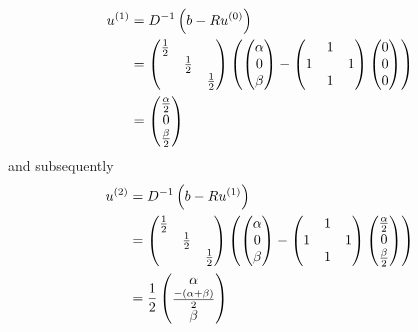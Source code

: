   \begin{align}
    u^{(1)} &= D^{-1}\left(b-Ru^{(0)}\right)\\\nonumber
    &= \begin{pmatrix}
      \frac{1}{2}&&\\
      &\frac{1}{2}&\\
      &&\frac{1}{2}
    \end{pmatrix}\left(  \begin{pmatrix}
      \alpha\\0\\\beta
    \end{pmatrix}-\begin{pmatrix}
      &1&\\
      1&&1\\
      &1&
    \end{pmatrix}\begin{pmatrix}
    0\\0\\0
  \end{pmatrix}\right)\\\nonumber
  &= \begin{pmatrix}
  \frac{\alpha}{2}\\0\\\frac{\beta}{2}
  \end{pmatrix}
  \end{align}
and subsequently
\begin{align}
  u^{(2)} &= D^{-1}\left(b-Ru^{(1)}\right)\\\nonumber
  &= \begin{pmatrix}
    \frac{1}{2}&&\\
    &\frac{1}{2}&\\
    &&\frac{1}{2}
  \end{pmatrix}\left(  \begin{pmatrix}
    \alpha\\0\\\beta
  \end{pmatrix}-\begin{pmatrix}
    &1&\\
    1&&1\\
    &1&
  \end{pmatrix}\begin{pmatrix}
  \frac{\alpha}{2}\\0\\\frac{\beta}{2}
  \end{pmatrix}\right)\\\nonumber
&= \frac{1}{2}\begin{pmatrix}
\alpha\\\frac{-(\alpha+\beta)}{2}\\\beta
\end{pmatrix}
\end{align}
